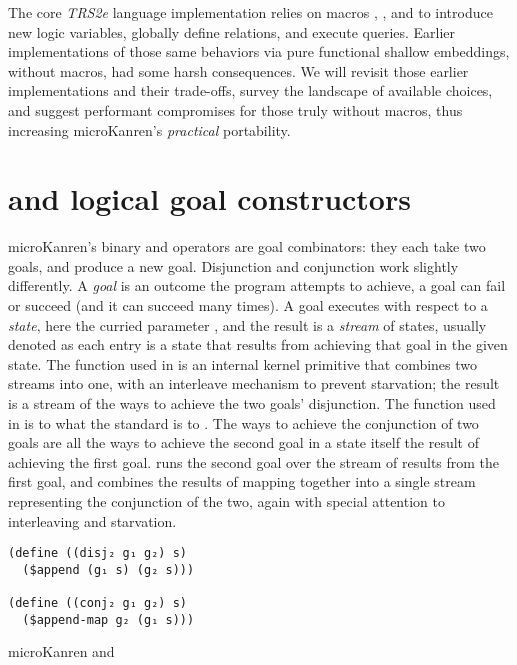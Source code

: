 \documentclass[sigplan,balance,pbalance,natbib=false]{acmart}
\begin{document}
The core \emph{TRS2e} language implementation relies on
macros , , and 
to introduce new logic variables, globally define relations, and
execute queries. Earlier implementations of those same behaviors via
pure functional shallow embeddings, without macros, had some harsh
consequences. We will revisit those earlier implementations and their
trade-offs, survey the landscape of available choices, and suggest
performant compromises for those truly without macros, thus increasing
microKanren's \emph{practical} portability.

\section{ and  logical goal
  constructors}\label{sec:conde}

microKanren's binary  and 
operators are goal combinators: they each take two goals, and produce
a new goal. Disjunction and conjunction work slightly differently. A
\emph{goal} is an outcome the program attempts to achieve, a goal can
fail or succeed (and it can succeed many times). A goal executes with
respect to a \emph{state}, here the curried parameter ,
and the result is a \emph{stream} of states, usually
denoted  as each entry is a state that results from
achieving that goal in the given state. The
 function used in  is an
internal kernel primitive that combines two streams into one, with an
interleave mechanism to prevent starvation; the result is a stream of
the ways to achieve the two goals' disjunction.
The  function used in  is
to
 what the standard  is
to . The ways to achieve the conjunction of two
goals are all the ways to achieve the second goal in a state itself
the result of achieving the first goal.\@ {}
runs the second goal over the stream of results from the first goal,
and combines the results of mapping together into a single stream
representing the conjunction of the two, again with special attention
to interleaving and starvation.

\begin{listing}
  \begin{verbatim}
(define ((disj₂ g₁ g₂) s)
  ($append (g₁ s) (g₂ s)))

(define ((conj₂ g₁ g₂) s)
  ($append-map g₂ (g₁ s)))
  \end{verbatim}
  \caption{microKanren  and }\label{mnt:disj2-conj2}
\end{listing}
\end{document}
